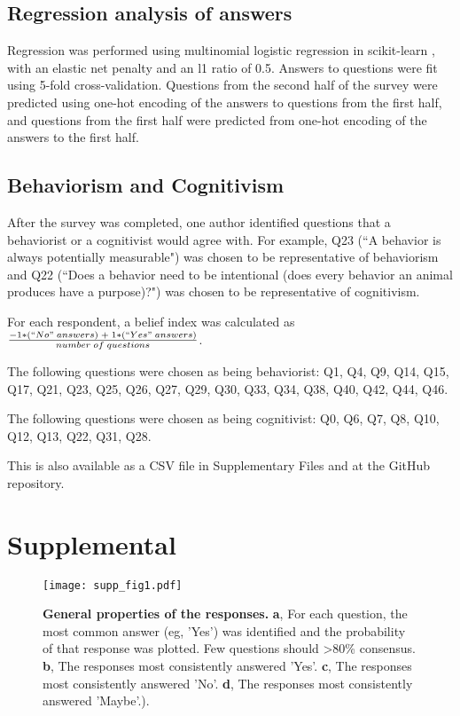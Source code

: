 \documentclass[a4paper, 11pt]{article}
\begin{document}
\subsection*{Regression analysis of answers}
Regression was performed using multinomial logistic regression in scikit-learn \cite{scikit-learn}, with an elastic net penalty and an l1 ratio of 0.5. Answers to questions were fit using 5-fold cross-validation. Questions from the second half of the survey were predicted using one-hot encoding of the answers to questions from the first half, and questions from the first half were predicted from one-hot encoding of the answers to the first half.

\subsection*{Behaviorism and Cognitivism}
After the survey was completed, one author identified questions that a  behaviorist or a cognitivist would agree with. For example, Q23 (``A behavior is always potentially measurable") was chosen to be representative of behaviorism and Q22 (``Does a behavior need to be intentional (does every behavior an animal produces have a purpose)?") was chosen to be representative of cognitivism.

For each respondent, a belief index was calculated as $\frac{-1 * (``No"\;answers)\; +\; 1*(``Yes"\;answers)}{number\;of\;questions}$.

The following questions were chosen as being behaviorist: Q1, Q4, Q9, Q14, Q15, Q17, Q21, Q23, Q25, Q26, Q27, Q29, Q30, Q33, Q34, Q38, Q40, Q42, Q44, Q46.

The following questions were chosen as being cognitivist: Q0, Q6, Q7, Q8, Q10, Q12, Q13, Q22, Q31, Q28.

This is also available as a CSV file in Supplementary Files and at the GitHub repository.

\section*{Supplemental}


\newpage





\setcounter{figure}{0}
\renewcommand{\thefigure}{S\arabic{figure}}

\begin{figure}
\centerline{\texttt{[image: supp\_fig1.pdf]}}
\caption{\textbf{General properties of the responses.} \textbf{a}, For each question, the most common answer (eg, 'Yes') was identified and the probability of that response was plotted. Few questions should >80\% consensus.  \textbf{b}, The responses most consistently answered 'Yes'. \textbf{c}, The responses most consistently answered 'No'. \textbf{d}, The responses most consistently answered 'Maybe'.).}
\end{figure}
\newpage
\end{document}
